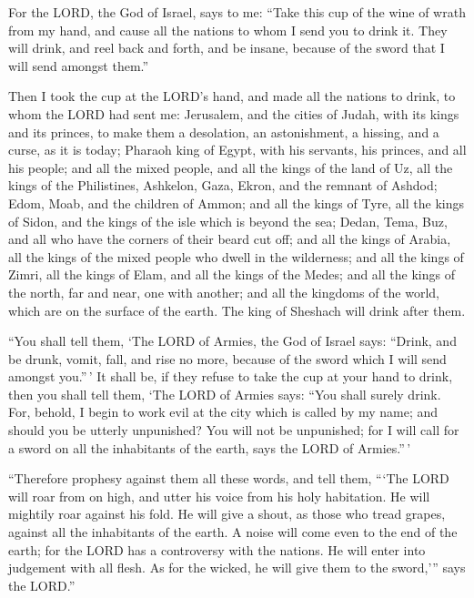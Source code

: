  For the LORD, the God of Israel, says to me: ``Take this
cup of the wine of wrath from my hand, and cause all the nations to whom
I send you to drink it.  They will drink, and reel back
and forth, and be insane, because of the sword that I will send amongst
them.''

 Then I took the cup at the LORD's hand, and made all the
nations to drink, to whom the LORD had sent me: 
Jerusalem, and the cities of Judah, with its kings and its princes, to
make them a desolation, an astonishment, a hissing, and a curse, as it
is today;  Pharaoh king of Egypt, with his servants, his
princes, and all his people;  and all the mixed people,
and all the kings of the land of Uz, all the kings of the Philistines,
Ashkelon, Gaza, Ekron, and the remnant of Ashdod;  Edom,
Moab, and the children of Ammon;  and all the kings of
Tyre, all the kings of Sidon, and the kings of the isle which is beyond
the sea;  Dedan, Tema, Buz, and all who have the corners
of their beard cut off;  and all the kings of Arabia, all
the kings of the mixed people who dwell in the wilderness;
 and all the kings of Zimri, all the kings of Elam, and
all the kings of the Medes;  and all the kings of the
north, far and near, one with another; and all the kingdoms of the
world, which are on the surface of the earth. The king of Sheshach will
drink after them.

 ``You shall tell them, `The LORD of Armies, the God of
Israel says: ``Drink, and be drunk, vomit, fall, and rise no more,
because of the sword which I will send amongst you.''\,' 
It shall be, if they refuse to take the cup at your hand to drink, then
you shall tell them, `The LORD of Armies says: ``You shall surely drink.
 For, behold, I begin to work evil at the city which is
called by my name; and should you be utterly unpunished? You will not be
unpunished; for I will call for a sword on all the inhabitants of the
earth, says the LORD of Armies.''\,'

 ``Therefore prophesy against them all these words, and
tell them, ```The LORD will roar from on high, and utter his voice from
his holy habitation. He will mightily roar against his fold. He will
give a shout, as those who tread grapes, against all the inhabitants of
the earth.  A noise will come even to the end of the
earth; for the LORD has a controversy with the nations. He will enter
into judgement with all flesh. As for the wicked, he will give them to
the sword,''' says the LORD.''

